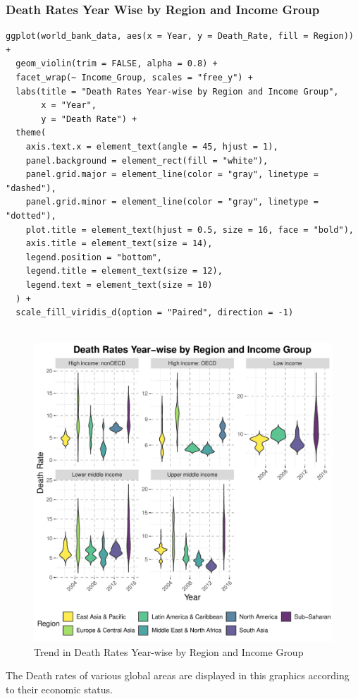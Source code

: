 \documentclass{article}\usepackage[]{graphicx}\usepackage[]{xcolor}
\makeatletter
\def\maxwidth{ %
  \ifdim\Gin@nat@width>\linewidth
    \linewidth
  \else
    \Gin@nat@width
  \fi
}
\newenvironment{knitrout}{}{} %
\makeatother
\begin{document}
\subsubsection{Death Rates Year Wise by Region and Income Group}
\begin{lstlisting}
ggplot(world_bank_data, aes(x = Year, y = Death_Rate, fill = Region)) +
  geom_violin(trim = FALSE, alpha = 0.8) +  
  facet_wrap(~ Income_Group, scales = "free_y") +  
  labs(title = "Death Rates Year-wise by Region and Income Group",
       x = "Year",
       y = "Death Rate") +
  theme(
    axis.text.x = element_text(angle = 45, hjust = 1),
    panel.background = element_rect(fill = "white"),
    panel.grid.major = element_line(color = "gray", linetype = "dashed"),
    panel.grid.minor = element_line(color = "gray", linetype = "dotted"),
    plot.title = element_text(hjust = 0.5, size = 16, face = "bold"),
    axis.title = element_text(size = 14),
    legend.position = "bottom",
    legend.title = element_text(size = 12),
    legend.text = element_text(size = 10)
  ) +
  scale_fill_viridis_d(option = "Paired", direction = -1) 


\end{lstlisting}
\newpage
\begin{figure}[h!]
\centering
\begin{knitrout}
\color{fgcolor}
\includegraphics[width=\maxwidth]{figure/unnamed-chunk-11-1} 
\end{knitrout}
\caption{Trend in Death Rates Year-wise by Region and Income Group}
\label{fig}
\end{figure}
The Death rates of various global areas are displayed in this graphics according to their economic status.\hfill \break
\end{document}
